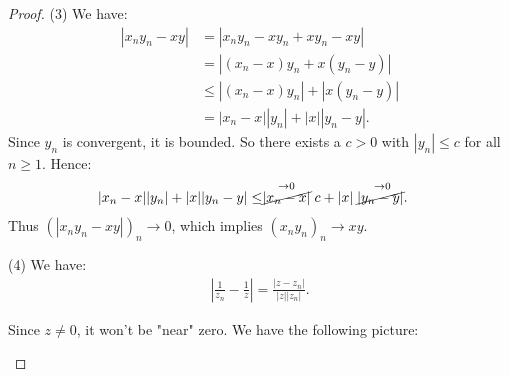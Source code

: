             \begin{proof}
                (3) We have:
                    \begin{equation*}
                    \begin{split}
                        |x_n y_n - xy|
                        & = |x_n y_n - xy_n + x y_n - xy| \\
                        & = \left|(x_n - x)y_n + x(y_n - y)\right|\\
                        & \leq |(x_n - x)y_n |+| x(y_n - y)| \\
                        & = |x_n - x||y_n| + |x||y_n - y|.
                    \end{split}
                    \end{equation*}
                Since $y_n$ is convergent, it is bounded. So there exists a $c > 0$ with $|y_n| \leq c$ for all $n \geq 1$. Hence:
                    \begin{equation*}
                    \begin{split}
                        |x_n - x||y_n| + |x||y_n - y|
                        & \leq \stackrel{\rightarrow 0}{\cancel{|x_n -x|}}c + |x|\stackrel{\rightarrow 0}{\cancel{|y_n - y|}.}
                    \end{split}
                    \end{equation*}
                Thus $(|x_n y_n - xy|)_n \rightarrow 0$, which implies $(x_n y_n)_n \rightarrow xy$.
    
                (4) We have:
                    \begin{equation*}
                    \begin{split}
                        \left|\frac{1}{z_n} - \frac{1}{z}\right| = \frac{|z- z_n|}{|z||z_n|}.
                    \end{split}
                    \end{equation*}
    
                Since $z \neq 0$, it won't be "near" zero. We have the following picture:
                    \begin{center}
\end{center}
\end{proof}
